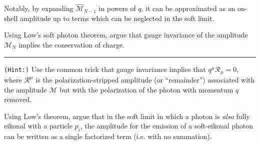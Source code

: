 Notably, by expanding \(\widehat{\mathcal{M}}_{N-1}\) in powers of \(q\), it can be approximated as an on-shell amplitude up to terms which can be neglected in the soft limit.


\begin{exercise}
    Using Low's soft photon theorem, argue that gauge invariance of the amplitude \(\mathcal{M}_N\) implies the conservation of charge.

    \vspace{7pt}
    \hrule
    \vspace{7pt}

    \texttt{(Hint:)}
    Use the common trick that gauge invariance implies that \(q^\mu \mathcal{R}_\mu = 0\), where \(\mathcal{R}^\mu\) is the polarization-stripped amplitude (or ``remainder'') associated with the amplitude \(\mathcal{M}\) but with the polarization of the photon with momentum \(q\) removed.
\end{exercise}

\begin{exercise}
    \label{ex:soft-eikonal-photon}
    Using Low's theorem, argue that in the soft limit in which a photon is \textit{also} fully eikonal with a particle \(p_i\), the amplitude for the emission of a soft-eikonal photon can be written as a single factorized term (i.e. with no summation).
\end{exercise}




